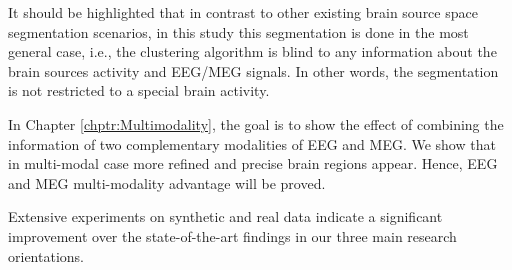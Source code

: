 It should be highlighted that in contrast to other existing brain source space segmentation scenarios, in this study this segmentation is done in the most general case, i.e., the clustering algorithm is blind to any information about the brain sources activity and EEG/MEG signals.
In other words, the segmentation is not restricted to a special brain activity.


In Chapter \ref{chptr:Multimodality}, the goal is to show the effect of combining the information of two complementary modalities of EEG and MEG.
We show that in multi-modal case more refined and precise brain regions appear.
Hence, EEG and MEG multi-modality advantage will be proved. %
   
Extensive experiments on synthetic and real data indicate a significant improvement over the state-of-the-art findings in our three main research orientations.


